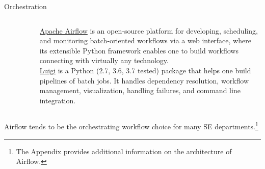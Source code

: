 \documentclass[pdf]{beamer}
\theoremstyle{remark}
\theoremstyle{definition}
\begin{document}
\begin{frame}[t]{Orchestration}
\begin{columns}[T]
\begin{column}{0.2\textwidth}
\begin{figure}[htbp]
  \captionsetup{justification=centering}
  \includegraphics[height=0.9cm, trim=0.1cm 0.1cm 0.1cm 0.1cm width=0.9cm]{Images/Apache_AirFlow.png}
\end{figure}
\vspace{13.0ex}
\begin{figure}[htbp]
  \captionsetup{justification=centering}
  \includegraphics[height=0.9cm, trim=0.1cm 0.1cm 0.1cm 0.1cm width=0.9cm]{Images/Luigi.png}
\end{figure}
\end{column}
\begin{column}{0.7\textwidth}  %
\href{https://airflow.apache.org/}{Apache Airflow} is an open-source platform for developing, scheduling, and monitoring batch-oriented workflows via a web interface, where its extensible Python framework enables one to build workflows connecting with virtually any technology. %
\\
\vspace{1.5ex}
\href{https://luigi.readthedocs.io/en/stable/index.html}{Luigi} is a Python (2.7, 3.6, 3.7 tested) package that helps one build pipelines of batch jobs. It handles dependency resolution, workflow management, visualization, handling failures, and command line integration.
\end{column}
\end{columns}
Airflow tends to be the orchestrating workflow choice for many SE departments.\footnote{The Appendix provides additional information on the architecture of Airflow.}
\end{frame}
\end{document}
